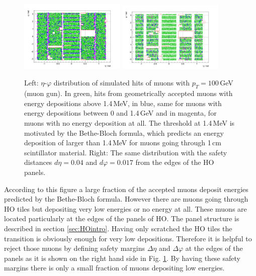 			\begin{figure}[htbp]
				\centering
				\includegraphics[width=0.45\textwidth]{Figures/erdogan/simhits_wo_deta_dphi.png}
				\includegraphics[width=0.45\textwidth]{Figures/erdogan/simhits_with_deta_dphi.png}
				\caption{Left: $\eta$-$\varphi$ distribution of simulated hits of muons with $p_T = 100$\,GeV (muon gun). In green, hits from geometrically accepted muons with energy depositions above 1.4\,MeV, in
				blue, same for muons with energy depositions between 0 and 1.4\,GeV and in magenta, for muons with no energy deposition at all. The threshold at 1.4\,MeV is motivated by the Bethe-Bloch formula,
				which predicts an energy deposition of larger than 1.4\,MeV for muons going through 1\,cm scintillator material. Right: The same distribution with the safety distances $d\eta = 0.04$ and
				$d\varphi = 0.017$ from the edges of the HO panels.}
				\label{fig:simhits_in_acceptance}
			\end{figure}
			According to this figure a large fraction of the accepted muons deposit energies predicted by the Bethe-Bloch formula.
			However there are muons going through HO tiles but depositing very low energies or no energy at all.
			These muons are located particularly at the edges of the panels of HO.
			The panel structure is described in section \ref{sec:HOintro}.
			Having only scratched the HO tiles the transition is obviously enough for very low depositions.
			Therefore it is helpful to reject those muons by defining safety margins $\Delta\eta$ and $\Delta\varphi$ at the edges of the panels as it is shown on the right hand side in Fig.
			\ref{fig:simhits_in_acceptance}.
			By having these safety margins there is only a small fraction of muons depositing low energies.
